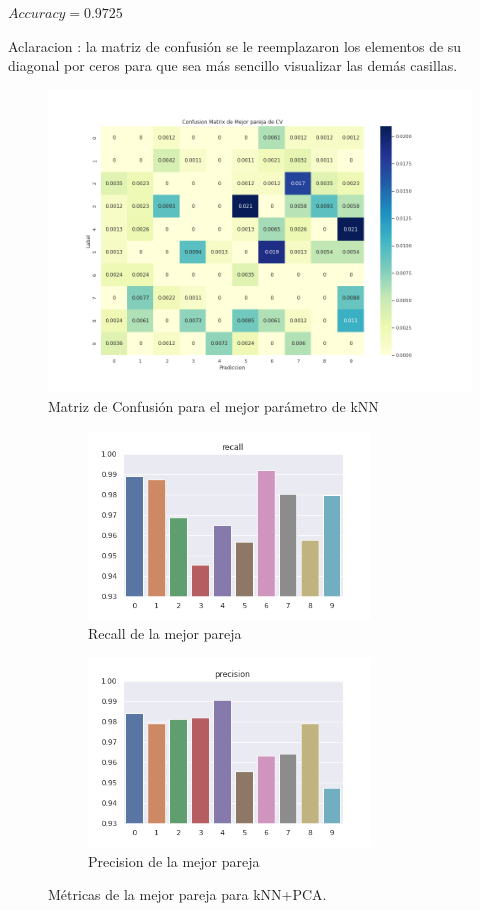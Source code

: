 \vspace{0.5cm}
$Accuracy = 0.9725 $
\par
\vspace{0.5cm}
Aclaracion : la matriz de confusión se le reemplazaron los elementos de su diagonal por ceros para que sea más sencillo visualizar las demás casillas.
\begin{figure}[H]
    \centering
    \includegraphics[width=14cm]{images/ConfMatrix_knnpca.png}%
    \qquad
    \caption{Matriz de Confusión para el mejor parámetro de kNN }
    \label{knnpca_MatrizConf}%
\end{figure}

\begin{figure}[h]
\begin{subfigure}{0.5\textwidth}
\includegraphics[width=0.9\linewidth, height=5cm]{images/recall_knnpca.png} 
\caption{Recall de la mejor pareja}
\label{fig:metpca1}
\end{subfigure}
\begin{subfigure}{0.5\textwidth}
\includegraphics[width=0.9\linewidth, height=5cm]{images/precision_knnpca.png} 
\caption{Precision de la mejor pareja}
\label{fig:metpca2}
\end{subfigure}
\caption{Métricas de la mejor pareja para kNN+PCA.}
\label{knnpca_metricas}%
\end{figure}


